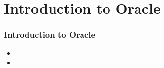\section{Introduction to Oracle}
\begin{frame}

	\frametitle{ Introduction to Oracle}
	
	\begin{itemize}
	
	    \item
	
	    \item
	
	\end{itemize}

\end{frame}